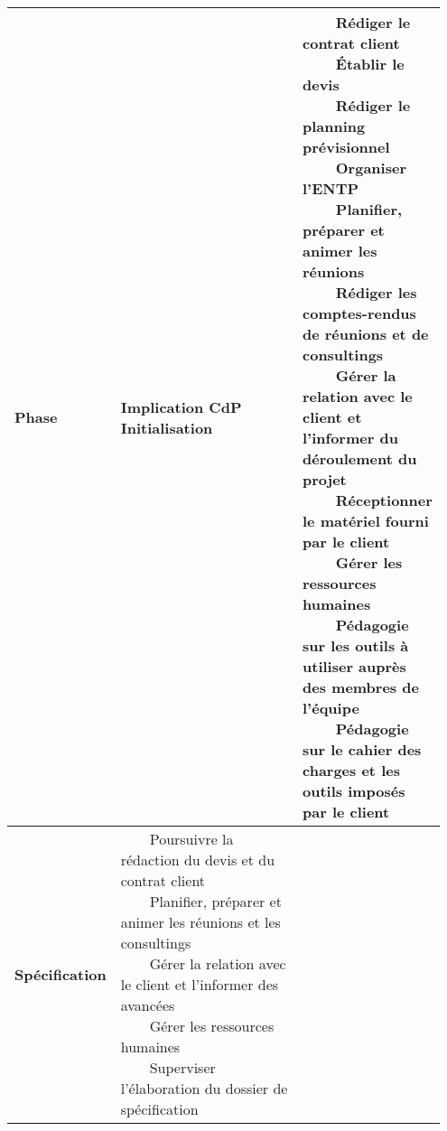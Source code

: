\documentclass[a4paper,11pt,titlepage]{article}
\makeatletter
\newcommand{\tabitem}{~~\llap{\textbullet}~~}
\newcommand{\ti}[1]{\begin{tabular}[c]{@{}l@{}}#1\end{tabular}} %
\makeatother
\begin{document}
\begin{longtable}{|p{0.15\linewidth}|p{0.8\linewidth}|}
    \hline
       \textbf{Phase} & \textbf{Implication CdP}  \endfirsthead
    \hline
    \textbf{Initialisation}                            & \ti{
    \tabitem Rédiger le contrat client                                                           \\
    \tabitem Établir le devis                                                                    \\
    \tabitem Rédiger le planning prévisionnel                                                    \\
    \tabitem Organiser l'ENTP                                                                    \\
    \tabitem Planifier, préparer et animer les réunions                                          \\
    \tabitem Rédiger les comptes-rendus de réunions et de consultings                            \\
    \tabitem Gérer la relation avec le client et l'informer du déroulement du projet             \\
    \tabitem Réceptionner le matériel fourni par le client                                       \\
    \tabitem Gérer les ressources humaines                                                       \\
    \tabitem Pédagogie sur les outils à utiliser auprès des membres de l'équipe                  \\
    \tabitem Pédagogie sur le cahier des charges et les outils imposés par le client             \\
    }                                                                                            \\ \hline
    \textbf{Spécification}                             & \ti{
    \tabitem Poursuivre la rédaction du devis et du contrat client                               \\
    \tabitem Planifier, préparer et animer les réunions et les consultings                       \\
    \tabitem Gérer la relation avec le client et l'informer des avancées                         \\
    \tabitem Gérer les ressources humaines                                                       \\
    \tabitem Superviser l'élaboration du dossier de spécification                                \\
}
\end{longtable}
\end{document}
